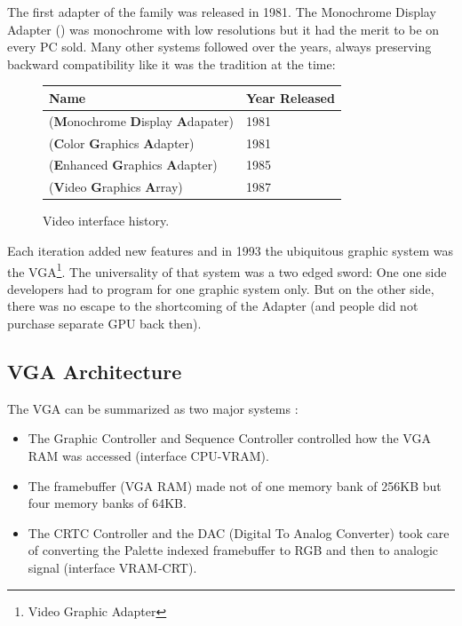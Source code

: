 \documentclass[book.tex]{subfiles}
\begin{document}
The first adapter of the family was released in 1981. The Monochrome Display
   Adapter () was monochrome with low resolutions but it had the merit to be on every PC sold. Many other systems followed over the years, always preserving backward compatibility like it was the tradition at the time:
\bigskip
  
 \begin{figure}[H]
\centering  
\begin{tabularx}{0.9\textwidth}{ X  Y }
  \toprule
  \textbf{Name} &  \textbf{Year Released} \\
  \toprule {}
   (\textbf{M}onochrome
   \textbf{D}isplay
   \textbf{A}dapater) & 1981 
   \\ 
   (\textbf{C}olor
   \textbf{G}raphics
   \textbf{A}dapter) & 1981 
    \\ 
   (\textbf{E}nhanced
   \textbf{G}raphics
   \textbf{A}dapter) & 1985
   \\ 
   (\textbf{V}ideo
   \textbf{G}raphics
   \textbf{A}rray)  & 1987
    \\
  \toprule
\end{tabularx}
\caption{Video interface history.}\label{fig:vga_history}
\end{figure}

Each iteration added new features and in 1993 the ubiquitous graphic system was the VGA\footnote{Video Graphic Adapter}. The universality of that system was a two edged sword: One one side developers had to program for one graphic system only. But on the other side, there was no escape to the shortcoming of the Adapter (and people did not purchase separate GPU back then).\\

\subsection{VGA Architecture}

The VGA can be summarized as two major systems :

\begin{itemize}
\item The Graphic Controller and Sequence Controller controlled how the VGA RAM was accessed (interface CPU-VRAM).
\item The framebuffer (VGA RAM) made not of one memory bank of 256KB but four memory banks of 64KB.
\item The CRTC Controller and the DAC (Digital To Analog Converter) took care of converting the Palette indexed framebuffer to RGB and then to analogic signal (interface VRAM-CRT).
\end{itemize}
\end{document}
